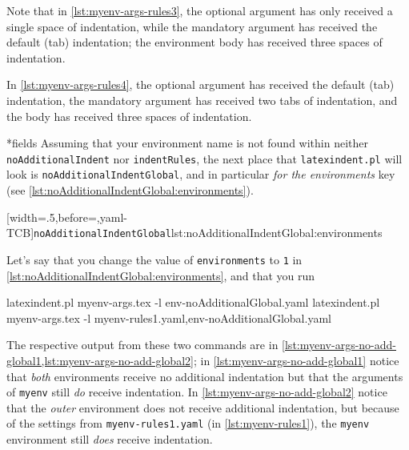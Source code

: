 	Note that in \cref{lst:myenv-args-rules3}, the optional argument has only received a
	single space of indentation, while the mandatory argument has received the default (tab)
	indentation; the environment body has received three spaces of indentation.

	In \cref{lst:myenv-args-rules4}, the optional argument has received the default (tab)
	indentation, the mandatory argument has received two tabs of indentation, and the body
	has received three spaces of indentation.

*{fields}
	Assuming that your environment name is not found within neither
	\texttt{noAdditionalIndent} nor \texttt{indentRules}, the next place that
	\texttt{latexindent.pl} will look is \texttt{noAdditionalIndentGlobal}, and in particular
	\emph{for the environments} key (see \cref{lst:noAdditionalIndentGlobal:environments}).

	[width=.5\linewidth,before=\centering,yaml-TCB]{\texttt{noAdditionalIndentGlobal}}{lst:noAdditionalIndentGlobal:environments}

	Let's say that you change the value of \texttt{environments} to \texttt{1} in
	\cref{lst:noAdditionalIndentGlobal:environments}, and that you run 

	\begin{widepage}
		\begin{commandshell}
latexindent.pl myenv-args.tex -l env-noAdditionalGlobal.yaml
latexindent.pl myenv-args.tex -l myenv-rules1.yaml,env-noAdditionalGlobal.yaml
\end{commandshell}
	\end{widepage}

	The respective output from these two commands are in
	\cref{lst:myenv-args-no-add-global1,lst:myenv-args-no-add-global2}; in
	\cref{lst:myenv-args-no-add-global1} notice that \emph{both} environments receive no
	additional indentation but that the arguments of \texttt{myenv} still \emph{do} receive
	indentation. In \cref{lst:myenv-args-no-add-global2} notice that the \emph{outer}
	environment does not receive additional indentation, but because of the settings from
	\texttt{myenv-rules1.yaml} (in \vref{lst:myenv-rules1}), the \texttt{myenv} environment
	still \emph{does} receive indentation.

	\begin{minipage}{.45\textwidth}
	\end{minipage}
	\hfill
	\begin{minipage}{.45\textwidth}
	\end{minipage}

